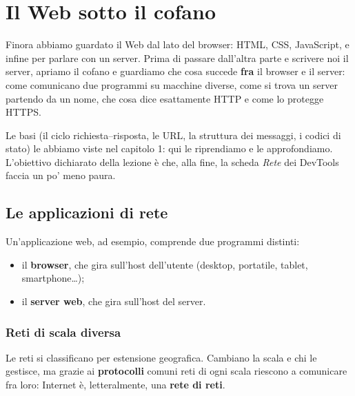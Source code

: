 \chapter{Il Web sotto il cofano}

Finora abbiamo guardato il Web dal lato del browser: HTML, CSS, JavaScript, e
infine  per parlare con un server. Prima di passare dall'altra parte
e scrivere noi il server, apriamo il cofano e guardiamo che cosa succede
\textbf{fra} il browser e il server: come comunicano due programmi su macchine
diverse, come si trova un server partendo da un nome, che cosa dice esattamente
HTTP e come lo protegge HTTPS.

Le basi (il ciclo richiesta--risposta, le URL, la struttura dei messaggi, i
codici di stato) le abbiamo viste nel capitolo 1: qui le riprendiamo e le
approfondiamo. L'obiettivo dichiarato della lezione è che, alla fine, la scheda
\textit{Rete} dei DevTools faccia un po' meno paura.

\section{Le applicazioni di rete}


Un'applicazione web, ad esempio, comprende due programmi distinti:

\begin{itemize}
  \item il \textbf{browser}, che gira sull'host dell'utente (desktop, portatile,
        tablet, smartphone\ldots);
  \item il \textbf{server web}, che gira sull'host del server.
\end{itemize}

\subsection{Reti di scala diversa}

Le reti si classificano per estensione geografica. Cambiano la scala e chi le
gestisce, ma grazie ai \textbf{protocolli} comuni reti di ogni scala riescono a
comunicare fra loro: Internet è, letteralmente, una \textbf{rete di reti}.


